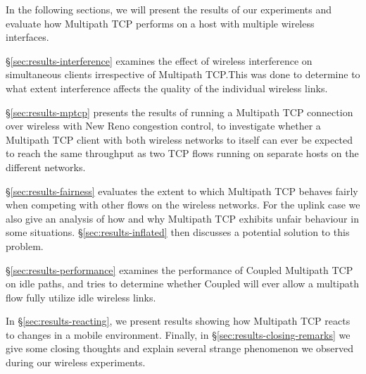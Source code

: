 In the following sections, we will present the results of our experiments and
evaluate how Multipath TCP performs on a host with multiple wireless
interfaces.

\S\ref{sec:results-interference} examines the effect of wireless
interference on simultaneous clients irrespective of Multipath TCP.\@ This was
done to determine to what extent interference affects the quality of the
individual wireless links.

\S\ref{sec:results-mptcp} presents the results of running a Multipath TCP
connection over wireless with New Reno congestion control, to investigate whether
a Multipath TCP client with both wireless networks to
itself can ever be expected to reach the same throughput as two TCP flows running on
separate hosts on the different networks.

\S\ref{sec:results-fairness} evaluates the extent to which Multipath TCP behaves
fairly when competing with other flows on the wireless networks. For the uplink
case we also give an analysis of how and why Multipath TCP exhibits unfair
behaviour in some situations. \S\ref{sec:results-inflated} then discusses a
potential solution to this problem.

\S\ref{sec:results-performance} examines the performance of Coupled Multipath
TCP on idle paths, and tries to determine whether Coupled will ever allow a
multipath flow fully utilize idle wireless links.

In \S\ref{sec:results-reacting}, we present results showing how Multipath TCP
reacts to changes in a mobile environment. Finally, in
\S\ref{sec:results-closing-remarks} we give some closing thoughts and explain
several strange phenomenon we observed during our wireless experiments.
